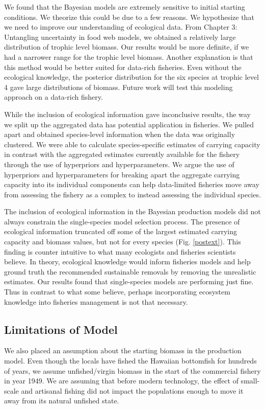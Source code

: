 \documentclass[oneside,12pt,final]{sty/ucthesis-CA2012}
\begin{document}
\begin{mainmatter}
We found that the Bayesian models are extremely sensitive to initial starting conditions. We theorize this could be due to a few reasons. We hypothesize that we need to improve our understanding of ecological data. From Chapter 3: Untangling uncertainty in food web models, we obtained a relatively large distribution of trophic level biomass. Our results would be more definite, if we had a narrower range for the trophic level biomass. Another explanation is that this method would be better suited for data-rich fisheries. Even without the ecological knowledge, the posterior distribution for the six species at trophic level 4 gave large distributions of biomass. Future work will test this modeling approach on a data-rich fishery.

\vspace{5mm}

While the inclusion of ecological information gave inconclusive results, the way we split up the aggregated data has potential application in fisheries. We pulled apart and obtained species-level information when the data was originally clustered. We were able to calculate species-specific estimates of carrying capacity in contrast with the aggregated estimates currently available for the fishery through the use of hyperpriors and hyperparameters. We argue the use of hyperpriors and hyperparameters for breaking apart the aggregate carrying capacity into its individual components can help data-limited fisheries move away from assessing the fishery as a complex to instead assessing the individual species. 

\vspace{5mm}
 
The inclusion of ecological information in the Bayesian production models did not always constrain the single-species model selection process. The presence of ecological information truncated off some of the largest estimated carrying capacity and biomass values, but not for every species (Fig. \ref{postext}). This finding is counter intuitive to what many ecologists and fisheries scientists believe. In theory, ecological knowledge would inform fisheries models and help ground truth the recommended sustainable removals by removing the unrealistic estimates. Our results found that single-species models are performing just fine. Thus in contrast to what some believe, perhaps incorporating ecosystem knowledge into fisheries management is not that necessary.
 
\subsection*{Limitations of Model}
We also placed an assumption about the starting biomass in the production model. Even though the locals have fished the Hawaiian bottomfish for hundreds of years, we assume unfished/virgin biomass in the start of the commercial fishery in year 1949. We are assuming that before modern technology, the effect of small-scale and artisanal fishing did not impact the populations enough to move it away from its natural unfished state. 


\end{mainmatter}
\end{document}
